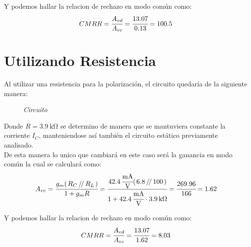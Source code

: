 \documentclass[a4paper,12pt]{article}
\newcommand{\parallelTwo}[2]{\left.#1\,\middle/\!\middle/\,#2\right.}
\newcommand{\mR}[1]{\SI{#1}{\kilo\ohm}}
\begin{document}
    Y podemos hallar la relacion de rechazo en modo común como:
    \begin{gather*}
        CMRR = \cfrac{A_{vd}}{A_{vc}} = \cfrac{13.07}{0.13} = 100.5
    \end{gather*}

\newpage
\section{Utilizando Resistencia}
Al utilizar una resistencia para la polarización, el circuito quedaría de la siguiente manera:
\begin{figure}[H]
    \setlength{\abovecaptionskip}{0pt}
    \centering
    \captionsetup{labelformat=empty}
    \caption{\small{\textit{ Circuito }}}
\end{figure}

    Donde $R = \mR{3.9}$ se determino de manera que se mantuviera constante la corriente $I_C$, manteniendose así también
    el circuito estático previamente analisado.
    \\
    De esta manera lo unico que cambiará en este caso será la ganancia en modo común la cual se calculará como:
        \begin{gather*}
            A_{vc} = \cfrac{g_m (\parallelTwo{R_C}{R_L})}{1 + g_m R }
                = \cfrac{ \SI{42.4}{\cfrac{mA}{V}} (\parallelTwo{6.8}{100}) }{ 1 + \SI{42.4}{\cfrac{mA}{V}} \cdot \mR{3.9} }
                = \cfrac{269.96}{166} = 1.62
        \end{gather*}
    
        Y podemos hallar la relacion de rechazo en modo común como:
        \begin{gather*}
            CMRR = \cfrac{A_{vd}}{A_{vc}} = \cfrac{13.07}{1.62} = 8.03
        \end{gather*}
\end{document}
